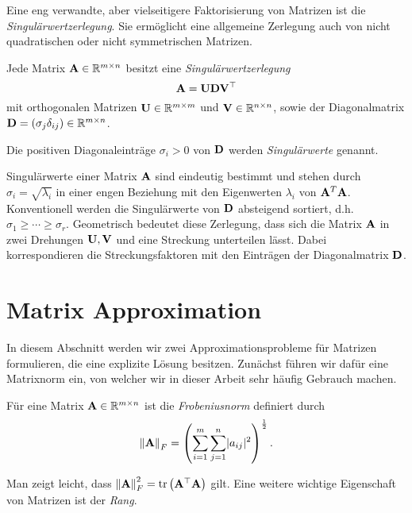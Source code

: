 Eine eng verwandte, aber vielseitigere Faktorisierung von Matrizen ist die \textit{Singulärwertzerlegung}. Sie ermöglicht eine allgemeine Zerlegung auch von nicht quadratischen oder nicht symmetrischen Matrizen.

\begin{thm}
Jede Matrix $\mathbf{A} \in \mathbb{R}^{m \times n}$ besitzt eine \textit{Singulärwertzerlegung} 
$$\mathbf{A} = \mathbf{U}\mathbf{D}\mathbf{V}^{\top}$$
mit orthogonalen Matrizen $\mathbf{U} \in \mathbb{R}^{m \times m}$ und $\mathbf{V} \in \mathbb{R}^{n \times n}$, sowie der Diagonalmatrix $\mathbf{D} = (\sigma_j\delta_{ij}) \in \mathbb{R}^{m \times n}$.
\end{thm}

\begin{defn}[Singulärwert]
Die positiven Diagonaleinträge $\sigma_{i} > 0$ von $\mathbf{D}$ werden \textit{Singulärwerte} genannt.
\end{defn}

Singulärwerte einer Matrix $\mathbf{A}$ sind eindeutig bestimmt und stehen durch $\sigma_i = \sqrt{\lambda_i}$ in einer engen Beziehung mit den Eigenwerten $\lambda_i$ von $\mathbf{A}^T\mathbf{A}$. Konventionell werden die Singulärwerte von $\mathbf{D}$ absteigend sortiert, d.h. $\sigma _{1} \geq \cdots \geq \sigma _{r}$. Geometrisch bedeutet diese Zerlegung, dass sich die Matrix $\mathbf{A}$ in zwei Drehungen $\mathbf{U}, \mathbf{V}$ und eine Streckung unterteilen lässt. Dabei korrespondieren die Streckungsfaktoren mit den Einträgen der Diagonalmatrix $\mathbf{D}$.


\section{Matrix Approximation}
\label{matrix_approximation}

In diesem Abschnitt werden wir zwei Approximationsprobleme für Matrizen formulieren, die eine explizite Lösung besitzen. Zunächst führen wir dafür eine Matrixnorm ein, von welcher wir in dieser Arbeit sehr häufig Gebrauch machen.

\begin{defn}
Für eine Matrix $\mathbf{A} \in \mathbb{R}^{m \times n}$ ist die \textit{Frobeniusnorm} definiert durch
$$\left\lVert \mathbf{A} \right\rVert_F = \left( \sum_{i=1}^{m} \sum_{j=1}^{n} \lvert a_{ij} \rvert ^{2} \right) ^{\frac{1}{2}}.$$
\end{defn}

Man zeigt leicht, dass $\left\lVert \mathbf{A} \right\rVert_F^2 = \text{tr} \left( \mathbf{A}^{\top} \mathbf{A} \right)$ gilt.
Eine weitere wichtige Eigenschaft von Matrizen ist der \textit{Rang}.

